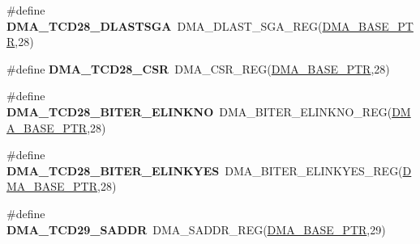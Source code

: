 \begin{DoxyCompactItemize}
\item 
\hypertarget{group___d_m_a___register___accessor___macros_gabd86a23c9cdc62f4fbf56e456d9c725d}{}\#define {\bfseries D\+M\+A\+\_\+\+T\+C\+D28\+\_\+\+D\+L\+A\+S\+T\+S\+G\+A}~D\+M\+A\+\_\+\+D\+L\+A\+S\+T\+\_\+\+S\+G\+A\+\_\+\+R\+E\+G(\hyperlink{group___d_m_a___peripheral_ga6997fbc1b1973e9f27170217a3bd6f22}{D\+M\+A\+\_\+\+B\+A\+S\+E\+\_\+\+P\+T\+R},28)\label{group___d_m_a___register___accessor___macros_gabd86a23c9cdc62f4fbf56e456d9c725d}

\item 
\hypertarget{group___d_m_a___register___accessor___macros_ga7e49b1b1d5b4d27ce4dcf5c3705ee526}{}\#define {\bfseries D\+M\+A\+\_\+\+T\+C\+D28\+\_\+\+C\+S\+R}~D\+M\+A\+\_\+\+C\+S\+R\+\_\+\+R\+E\+G(\hyperlink{group___d_m_a___peripheral_ga6997fbc1b1973e9f27170217a3bd6f22}{D\+M\+A\+\_\+\+B\+A\+S\+E\+\_\+\+P\+T\+R},28)\label{group___d_m_a___register___accessor___macros_ga7e49b1b1d5b4d27ce4dcf5c3705ee526}

\item 
\hypertarget{group___d_m_a___register___accessor___macros_ga57502a999ff53cc28dcaf2fa794ab571}{}\#define {\bfseries D\+M\+A\+\_\+\+T\+C\+D28\+\_\+\+B\+I\+T\+E\+R\+\_\+\+E\+L\+I\+N\+K\+N\+O}~D\+M\+A\+\_\+\+B\+I\+T\+E\+R\+\_\+\+E\+L\+I\+N\+K\+N\+O\+\_\+\+R\+E\+G(\hyperlink{group___d_m_a___peripheral_ga6997fbc1b1973e9f27170217a3bd6f22}{D\+M\+A\+\_\+\+B\+A\+S\+E\+\_\+\+P\+T\+R},28)\label{group___d_m_a___register___accessor___macros_ga57502a999ff53cc28dcaf2fa794ab571}

\item 
\hypertarget{group___d_m_a___register___accessor___macros_gaf41fc8b22a17c04de85620c111044270}{}\#define {\bfseries D\+M\+A\+\_\+\+T\+C\+D28\+\_\+\+B\+I\+T\+E\+R\+\_\+\+E\+L\+I\+N\+K\+Y\+E\+S}~D\+M\+A\+\_\+\+B\+I\+T\+E\+R\+\_\+\+E\+L\+I\+N\+K\+Y\+E\+S\+\_\+\+R\+E\+G(\hyperlink{group___d_m_a___peripheral_ga6997fbc1b1973e9f27170217a3bd6f22}{D\+M\+A\+\_\+\+B\+A\+S\+E\+\_\+\+P\+T\+R},28)\label{group___d_m_a___register___accessor___macros_gaf41fc8b22a17c04de85620c111044270}

\item 
\hypertarget{group___d_m_a___register___accessor___macros_ga3718458d972d759ab8724a539d73fa12}{}\#define {\bfseries D\+M\+A\+\_\+\+T\+C\+D29\+\_\+\+S\+A\+D\+D\+R}~D\+M\+A\+\_\+\+S\+A\+D\+D\+R\+\_\+\+R\+E\+G(\hyperlink{group___d_m_a___peripheral_ga6997fbc1b1973e9f27170217a3bd6f22}{D\+M\+A\+\_\+\+B\+A\+S\+E\+\_\+\+P\+T\+R},29)\label{group___d_m_a___register___accessor___macros_ga3718458d972d759ab8724a539d73fa12}


\end{DoxyCompactItemize}
